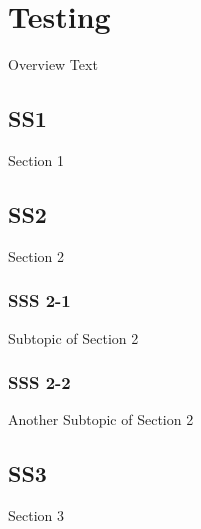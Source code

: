 \section{Testing}
Overview Text

\subsection{SS1}
Section 1

\subsection{SS2}
Section 2

\subsubsection{SSS 2-1}
Subtopic of Section 2

\subsubsection{SSS 2-2}
Another Subtopic of Section 2

\subsection{SS3}
Section 3